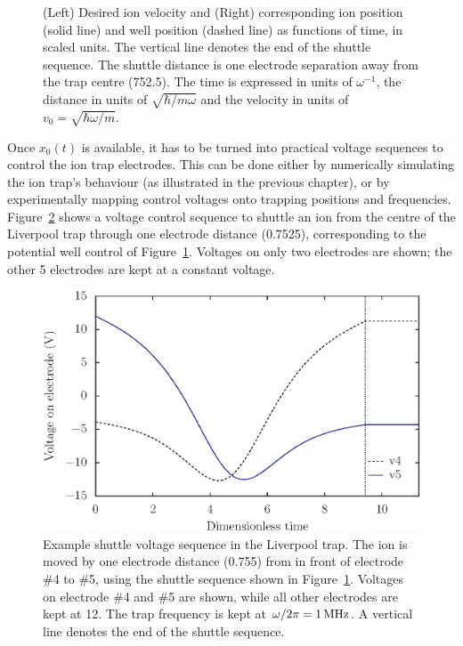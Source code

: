 \begin{figure}[!t]
\begin{center}
\end{center}
\caption[Theoretical single ion shuttle curve]{(Left) Desired ion velocity and (Right) corresponding ion position (solid line) and well position (dashed line) as functions of time, in scaled units. The vertical line denotes the end of the shuttle sequence. The shuttle distance is one electrode separation away from the trap centre (752.5\um). 
The time is expressed in units of $\omega^{-1}$, the distance in units of $\sqrt{\hbar / m \omega}$ and the velocity in units of $v_0 = \sqrt{\hbar \omega/m}$.
}
\label{fig:movewelleg}
\end{figure} 



Once $x_0(t)$ is available, it has to be turned into practical voltage sequences to control the ion trap electrodes. This can be done either by numerically simulating the ion trap's behaviour (as illustrated in the previous chapter), or by experimentally mapping control voltages onto trapping positions and frequencies. Figure~\ref{fig:theoryshuttle} shows a voltage control sequence to shuttle an ion from the centre of the Liverpool trap through one electrode distance (0.7525\mm), corresponding to the potential well control of Figure~\ref{fig:movewelleg}. Voltages on only two electrodes are shown; the other 5 electrodes are kept at a constant voltage. 

 \begin{figure}[h!t]
 \centering
 \includegraphics{chapter3/movewell/idealshuttle_t3_volts}
 \caption[Example voltage sequence for single ion shuttle]{Example shuttle voltage sequence in the Liverpool trap. The ion is moved by one electrode distance (0.755\mm) from in front of electrode \#4 to \#5, using the shuttle sequence shown in Figure~\ref{fig:movewelleg}. Voltages on electrode \#4 and \#5 are shown, while all other electrodes are kept at 12\V. The trap frequency is kept at $\omega/2\pi = 1\,\mbox{MHz}$. A vertical line denotes the end of the shuttle sequence.}
 \label{fig:theoryshuttle}
 \end{figure} 


